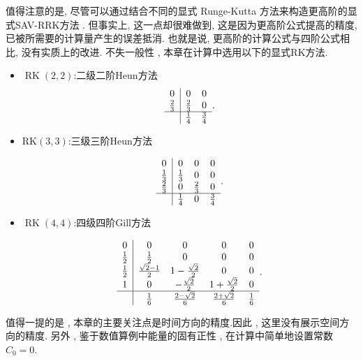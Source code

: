 值得注意的是, 尽管可以通过结合不同的显式 Runge-Kutta 方法来构造更高阶的显式SAV-RRK方法 .
但事实上, 这一点却很难做到, 这是因为更高阶公式提高的精度, 已被所需要的计算量产生的误差抵消. 
也就是说, 更高阶的计算公式与四阶公式相比, 没有实质上的改进.
不失一般性 , 本章在计算中选用以下的显式RK方法\cite{shuEfficientImplementationEssentially1988}.
\begin{itemize}
\item $\operatorname{RK}(2 , 2)$:二级二阶Heun方法%
\begin{equation}
\begin{array}{c|cc}
0 & 0 & 0 \\
\frac{2}{3} & \frac{2}{3} & 0 \\
\hline & \frac{1}{4} & \frac{3}{4}
\end{array}.
\end{equation}
	
\item $\mathrm{RK}(3 , 3)$:三级三阶Heun方法%
	
\begin{equation}
\begin{array}{c|ccc}
0 & 0 & 0 & 0 \\
\frac{1}{3} & \frac{1}{3} & 0 & 0 \\
\frac{2}{3} & 0 & \frac{2}{3} & 0 \\
\hline & \frac{1}{4} & 0 & \frac{3}{4}
\end{array}.
\end{equation}
		
\item $\operatorname{RK}(4 , 4)$:四级四阶Gill方法%
		
\begin{equation}
\begin{array}{c|cccc}
0 & 0 & 0 & 0 & 0 \\
\frac{1}{2} & \frac{1}{2} & 0 & 0 & 0 \\
\frac{1}{2} & \frac{\sqrt{2}-1}{2} & 1-\frac{\sqrt{2}}{2} & 0 & 0 \\
1 & 0 & -\frac{\sqrt{2}}{2} & 1+\frac{\sqrt{2}}{2} & 0 \\
\hline & \frac{1}{6} & \frac{2-\sqrt{2}}{6} & \frac{2+\sqrt{2}}{6} & \frac{1}{6}
\end{array}.
\end{equation}
\end{itemize}

值得一提的是 , 本章的主要关注点是时间方向的精度.因此 , 这里没有展示空间方向的精度.
另外 , 鉴于数值算例中能量的固有正性 , 在计算中简单地设置常数$C_0=0$.

